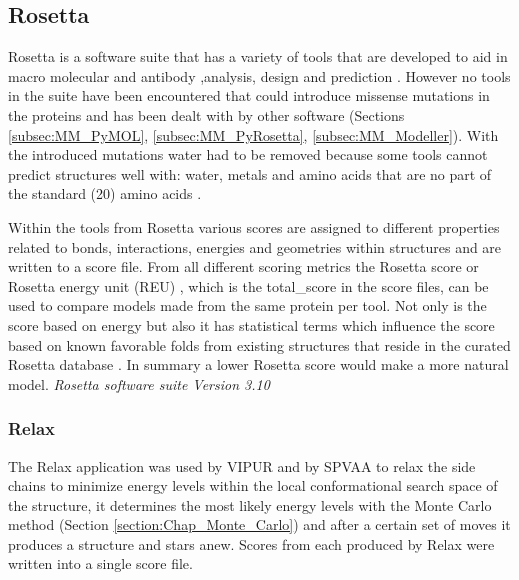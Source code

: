 \subsection{Rosetta}
Rosetta is a software suite that has a variety of tools that are developed to aid in macro molecular and antibody ,analysis, design and prediction \cite{}.
However no tools in the suite have been encountered that could introduce missense mutations in the proteins and has been dealt with by other software (Sections \ref{subsec:MM_PyMOL}, \ref{subsec:MM_PyRosetta}, \ref{subsec:MM_Modeller}). With the introduced mutations water had to be removed because some tools cannot predict structures well with: water, metals and amino acids that are no part of the standard (20) amino acids \cite{}.

Within the tools from Rosetta various scores are assigned to different properties related to bonds, interactions, energies and geometries within structures and are written to a score file. From all different scoring metrics the Rosetta score or Rosetta energy unit (REU) , which is the total\_score in the score files, can be used to compare models made from the same protein per tool. Not only is the score based on energy but also it has statistical terms which influence the score based on known favorable folds from existing structures that reside in the curated Rosetta database \cite{}. In summary a lower Rosetta score would make a more natural model.
\label{subsec:MM_Rosetta}
\newline
\textit{Rosetta software suite Version 3.10}

\subsubsection{Relax}
The Relax application was used by VIPUR and by SPVAA to relax the side chains to minimize energy levels within the local conformational search space \cite{} of the structure, it determines the most likely energy levels with the Monte Carlo method (Section \ref{section:Chap_Monte_Carlo}) and after a certain set of moves it produces a structure and stars anew\cite{}. Scores from each produced by Relax were written into a single score file.
\label{subsubsec:MM_Relax}

